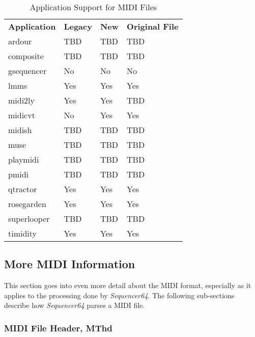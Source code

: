    \begin{table}
      \centering
      \caption{Application Support for MIDI Files}
      \label{table:midi_file_support_table}
      \begin{tabular}{l l l l}
         \textbf{Application}  &
            \textbf{Legacy} &
            \textbf{New} & 
            \textbf{Original File} \\
         ardour       & TBD       & TBD       & TBD \\
         composite    & TBD       & TBD       & TBD \\
         gsequencer   & No        & No        & No \\
         lmms         & Yes       & Yes       & Yes \\
         midi2ly      & Yes       & Yes       & TBD \\
         midicvt      & No        & Yes       & Yes \\
         midish       & TBD       & TBD       & TBD \\
         muse         & TBD       & TBD       & TBD \\
         playmidi     & TBD       & TBD       & TBD \\
         pmidi        & TBD       & TBD       & TBD \\
         qtractor     & Yes       & Yes       & Yes \\
         rosegarden   & Yes       & Yes       & Yes \\
         superlooper  & TBD       & TBD       & TBD \\
         timidity     & Yes       & Yes       & Yes \\
      \end{tabular}
   \end{table}

\subsection{More MIDI Information}
\label{subsec:midi_information_more}

   This section goes into even more detail about the MIDI format, especially as
   it applies to the processing done by \textsl{Sequencer64}.
   The following sub-sections describe how \textsl{Sequencer64}
   parses a MIDI file.

\subsubsection{MIDI File Header, MThd}
\label{subsubsec:midi_format_header}

